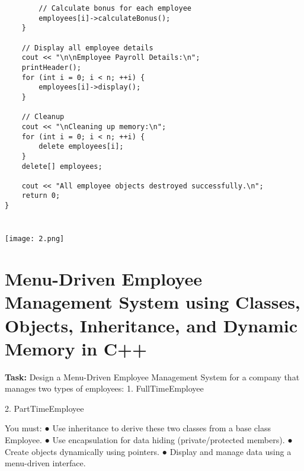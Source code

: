 \documentclass[12pt,a4paper]{article}
\begin{document}
\begin{lstlisting}
        // Calculate bonus for each employee
        employees[i]->calculateBonus();
    }

    // Display all employee details
    cout << "\n\nEmployee Payroll Details:\n";
    printHeader();
    for (int i = 0; i < n; ++i) {
        employees[i]->display();
    }

    // Cleanup
    cout << "\nCleaning up memory:\n";
    for (int i = 0; i < n; ++i) {
        delete employees[i];
    }
    delete[] employees;

    cout << "All employee objects destroyed successfully.\n";
    return 0;
}


\end{lstlisting}

\subsubsection{}
\begin{center}
    \texttt{[image: 2.png]}
\end{center}


\section{Menu-Driven Employee Management System using Classes, Objects, Inheritance, and Dynamic Memory in C++}
\textbf{Task:} Design a Menu-Driven Employee Management System for a company that manages two types of employees:
1. FullTimeEmployee

2. PartTimeEmployee

You must:
● Use inheritance to derive these two classes from a base class Employee.
● Use encapsulation for data hiding (private/protected members).
● Create objects dynamically using pointers.
● Display and manage data using a menu-driven interface.
\end{document}
